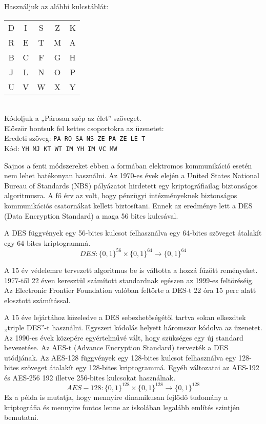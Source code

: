 \begin{center}
Használjuk az alábbi kulcstáblát:\\
\begin{tabular}{ccccc}
\hline 
D  & I  & S  & Z  & K\tabularnewline
R  & E  & T  & M  & A\tabularnewline
B  & C  & F  & G  & H\tabularnewline
J  & L  & N  & O  & P\tabularnewline
U  & V  & W  & X  & Y\tabularnewline
\end{tabular}\\
 Kódoljuk a „Párosan szép az élet” szöveget.\\
 Először bontsuk fel kettes csoportokra az üzenetet:\\
 Eredeti szöveg: \texttt{PA RO SA NS ZE PA ZE LE T}\\
 Kód: \hspace{1.63cm} \texttt{YH MJ KT WT IM YH IM VC MW}\\
 
\par\end{center}

Sajnos a fenti módszereket ebben a formában elektromos kommunikáció
esetén nem lehet hatékonyan használni. Az 1970-es évek elején a United
States National Bureau of Standards (NBS) pályázatot hirdetett egy
kriptográfiailag biztonságos algoritmusra. A fő érv az volt, hogy
pénzügyi intézményeknek biztonságos kommunikációs csatornákat kellett
biztosítani. Ennek az eredménye lett a DES (Data Encryption Standard)
a maga 56 bites kulcsával.

A DES függvények egy 56-bites kulcsot felhasználva egy 64-bites szöveget
átalakít egy 64-bites kriptogrammá. 
\[
DES:\{0,1\}^{56}\times\{0,1\}^{64}\rightarrow\{0,1\}^{64}
\]

A 15 év védelemre tervezett algoritmus be is váltotta a hozzá fűzött
reményeket. 1977-től 22 éven keresztül számított standardnak egészen
az 1999-es feltöréséig. Az Electronic Frontier Foundation valóban
feltörte a DES-t 22 óra 15 perc alatt elosztott számítással.

A 15 éve lejártához közeledve a DES sebezhetőségétől tartva sokan
elkezdtek „triple DES”-t használni. Egyszeri kódolás helyett háromszor
kódolva az üzenetet. Az 1990-es évek közepére egyértelművé vált, hogy
szükséges egy új standard bevezetése. Az AES-t (Advance Encryption
Standard) tervezték a DES utódjának. Az AES-128 függvények egy 128-bites
kulcsot felhasználva egy 128-bites szöveget átalakít egy 128-bites
kriptogrammá. Egyéb változatai az AES-192 és AES-256 192 illetve 256-bites
kulcsokat használnak. 
\[
AES-128:\{0,1\}^{128}\times\{0,1\}^{128}\rightarrow\{0,1\}^{128}
\]
Ez a példa is mutatja, hogy mennyire dinamikusan fejlődő tudomány
a kriptográfia és mennyire fontos lenne az iskolában legalább említés
szintjén bemutatni. 

